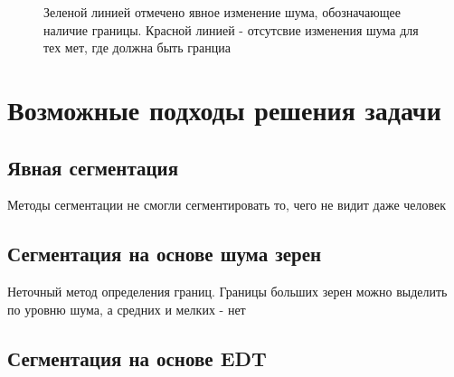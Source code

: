 \documentclass[a4paper, 14pt]{article}
\begin{document}
	 \begin{figure}[h]
			\caption{Зеленой линией отмечено явное изменение шума, обозначающее наличие границы. Красной линией - отсутсвие изменения шума для тех мет, где должна быть гранциа}
			\label{grad_noise_marked}
	\end{figure}


	\section{Возможные подходы решения задачи}
	
	\subsection{Явная сегментация}
	
	Методы сегментации не смогли сегментировать то, чего не видит даже человек
	\subsection{Сегментация на основе шума зерен}
	
	Неточный метод определения границ. Границы больших зерен можно выделить по уровню шума, а средних и мелких - нет
	\subsection{Сегментация на основе EDT}
	
\end{document}
